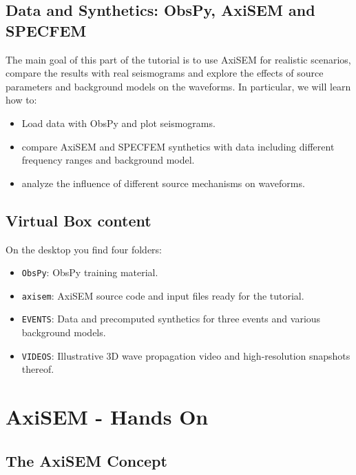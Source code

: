 \documentclass{article}
\begin{document}
\subsection*{Data and Synthetics: ObsPy, AxiSEM and SPECFEM}
The main goal of this part of the tutorial is to use AxiSEM for realistic
scenarios, compare the results with real seismograms and explore the effects of
source parameters and background models on the waveforms. In particular, we will
learn how to:

\begin{itemize}
    \item Load data with ObsPy and plot seismograms.
    \item compare AxiSEM and SPECFEM synthetics with data including
        different frequency ranges and background model.
    \item analyze the influence of different source mechanisms on waveforms.
\end{itemize}


\subsection*{Virtual Box content}
On the desktop you find four folders:
\begin{itemize}
    \item \verb|ObsPy|: ObsPy training material.
    \item \verb|axisem|: AxiSEM source code and input files ready for the tutorial.
    \item \verb|EVENTS|: Data and precomputed synthetics for three events and various background models.
    \item \verb|VIDEOS|: Illustrative 3D wave propagation video and high-resolution snapshots thereof.
\end{itemize}

\newpage

\section{AxiSEM - Hands On}

\subsection*{The AxiSEM Concept}
\end{document}

